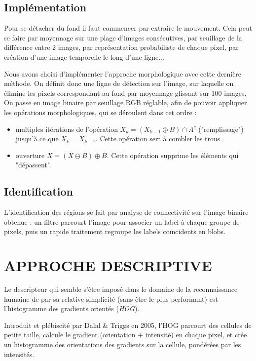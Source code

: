 \documentclass{article}
\begin{document}
	\subsection{Implémentation}
	Pour se détacher du fond il faut commencer par extraire le mouvement. Cela peut se faire par moyennage sur une plage d'images consécutives, par seuillage de la différence entre 2 images, par représentation probabiliste de chaque pixel, par création d'une image temporelle le long d'une ligne...
	
	Nous avons choisi d'implémenter l'approche morphologique avec cette dernière méthode. On définit donc une ligne de détection sur l'image, sur laquelle on élimine les pixels correspondant au fond par moyennage glissant sur 100 images. 
	On passe en image binaire par seuillage RGB réglable, afin de pouvoir appliquer les opérations morphologiques, qui se déroulent dans cet ordre :
	\begin{itemize}
	\item multiples itérations de l'opération $X_k = (X_{k-1} \oplus B) \cap A^c$ ("remplissage") jusqu'à ce que $X_k = X_{k-1}$. Cette opération sert à combler les trous.
	\item ouverture $X = (X \ominus B) \oplus B$. Cette opération supprime les éléments qui "dépassent".
	\end{itemize}
	
	\subsection{Identification}
	L'identification des régions se fait par analyse de connectivité sur l'image binaire obtenue : un filtre parcourt l'image pour associer un label à chaque groupe de pixels, puis un rapide traitement regroupe les labels coïncidents en blobs.
	
	
\section{APPROCHE DESCRIPTIVE}
\label{sec:desc}

	Le descripteur qui semble s'être imposé dans le domaine de la reconnaissance humaine de par sa relative simplicité (sans être le plus performant) est l'histogramme des gradients orientés (\emph{HOG}).
	
	Introduit et plébiscité par Dalal \& Triggs \cite{HOG} en 2005, l'HOG parcourt des cellules de petite taille, calcule le gradient (orientation + intensité) en chaque pixel, et crée un histogramme des orientations des gradients sur la cellule, pondérées par les intensités.
	
\end{document}
